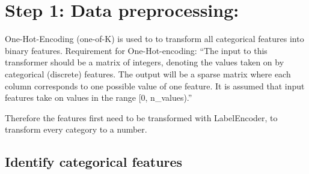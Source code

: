 \documentclass[11pt]{article}
\begin{document}
    \hypertarget{step-1-data-preprocessing}{%
\section{Step 1: Data preprocessing:}\label{step-1-data-preprocessing}}

One-Hot-Encoding (one-of-K) is used to to transform all categorical
features into binary features. Requirement for One-Hot-encoding: ``The
input to this transformer should be a matrix of integers, denoting the
values taken on by categorical (discrete) features. The output will be a
sparse matrix where each column corresponds to one possible value of one
feature. It is assumed that input features take on values in the range
{[}0, n\_values).''

Therefore the features first need to be transformed with LabelEncoder,
to transform every category to a number.

    \hypertarget{identify-categorical-features}{%
\subsection{Identify categorical
features}\label{identify-categorical-features}}
\end{document}
